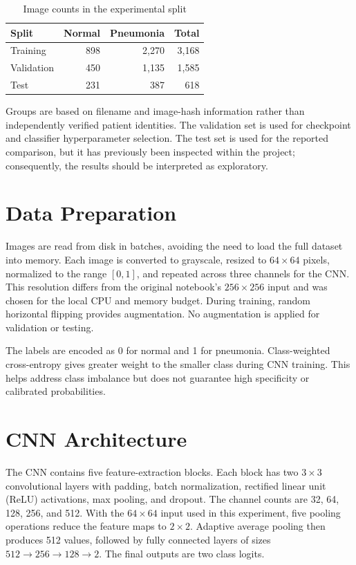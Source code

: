 \documentclass[conference]{IEEEtran}
\begin{document}
\begin{table}[ht]
\caption{Image counts in the experimental split}
\label{tab:split}
\centering
\begin{tabular}{lrrr}
\toprule
Split & Normal & Pneumonia & Total \\
\midrule
Training & 898 & 2,270 & 3,168 \\
Validation & 450 & 1,135 & 1,585 \\
Test & 231 & 387 & 618 \\
\bottomrule
\end{tabular}
\end{table}

Groups are based on filename and image-hash information rather than independently verified patient identities. The validation set is used for checkpoint and classifier hyperparameter selection. The test set is used for the reported comparison, but it has previously been inspected within the project; consequently, the results should be interpreted as exploratory.

\section{Data Preparation}
Images are read from disk in batches, avoiding the need to load the full dataset into memory. Each image is converted to grayscale, resized to $64\times64$ pixels, normalized to the range $[0,1]$, and repeated across three channels for the CNN. This resolution differs from the original notebook's $256\times256$ input and was chosen for the local CPU and memory budget. During training, random horizontal flipping provides augmentation. No augmentation is applied for validation or testing.

The labels are encoded as 0 for normal and 1 for pneumonia. Class-weighted cross-entropy gives greater weight to the smaller class during CNN training. This helps address class imbalance but does not guarantee high specificity or calibrated probabilities.

\section{CNN Architecture}
The CNN contains five feature-extraction blocks. Each block has two $3\times3$ convolutional layers with padding, batch normalization, rectified linear unit (ReLU) activations, max pooling, and dropout. The channel counts are 32, 64, 128, 256, and 512. With the $64\times64$ input used in this experiment, five pooling operations reduce the feature maps to $2\times2$. Adaptive average pooling then produces 512 values, followed by fully connected layers of sizes $512\rightarrow256\rightarrow128\rightarrow2$. The final outputs are two class logits.
\end{document}
